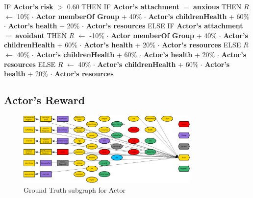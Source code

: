 \documentclass{article}%
\begin{document}
%
\begin{flushleft}%
IF %
\textbf{Actor's risk}%
$>$%
0.60%
\linebreak%
\hspace*{2em}%
THEN %
IF %
\textbf{Actor's attachment}%
$=$%
\textbf{anxious}%
\linebreak%
\hspace*{4em}%
THEN %
$R$%
$\leftarrow$%
10\%%
$\cdot$%
\textbf{Actor memberOf Group}%
+%
40\%%
$\cdot$%
\textbf{Actor's childrenHealth}%
+%
60\%%
$\cdot$%
\textbf{Actor's health}%
+%
20\%%
$\cdot$%
\textbf{Actor's resources}%
\linebreak%
\hspace*{4em}%
ELSE %
IF %
\textbf{Actor's attachment}%
$=$%
\textbf{avoidant}%
\linebreak%
\hspace*{6em}%
THEN %
$R$%
$\leftarrow$%
{-}10\%%
$\cdot$%
\textbf{Actor memberOf Group}%
+%
40\%%
$\cdot$%
\textbf{Actor's childrenHealth}%
+%
60\%%
$\cdot$%
\textbf{Actor's health}%
+%
20\%%
$\cdot$%
\textbf{Actor's resources}%
\linebreak%
\hspace*{6em}%
ELSE %
$R$%
$\leftarrow$%
40\%%
$\cdot$%
\textbf{Actor's childrenHealth}%
+%
60\%%
$\cdot$%
\textbf{Actor's health}%
+%
20\%%
$\cdot$%
\textbf{Actor's resources}%
\linebreak%
\hspace*{2em}%
ELSE %
$R$%
$\leftarrow$%
40\%%
$\cdot$%
\textbf{Actor's childrenHealth}%
+%
60\%%
$\cdot$%
\textbf{Actor's health}%
+%
20\%%
$\cdot$%
\textbf{Actor's resources}%
\end{flushleft}

%
\subsection{Actor's Reward}%
\label{subsec:Actor's Reward}%


\begin{figure}[ht]%
\centering%
\includegraphics[width=0.8\textwidth]{images/Actor.png}%
\caption{Ground Truth subgraph for Actor}%
\end{figure}
\end{document}
